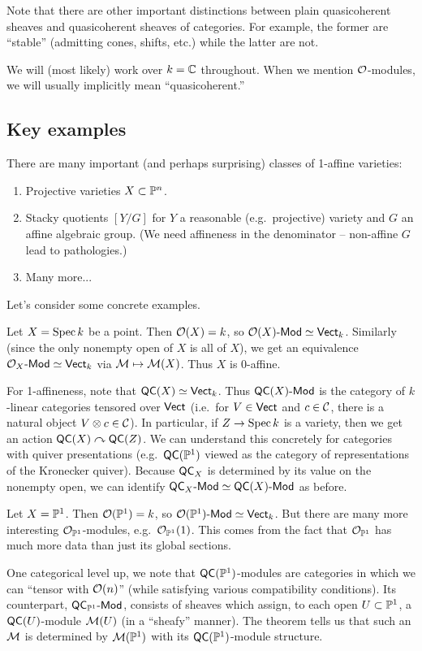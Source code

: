 \documentclass{article}
\begin{document}
Note that there are other important distinctions between plain quasicoherent sheaves and quasicoherent sheaves of categories.
For example, the former are ``stable'' (admitting cones, shifts, etc.) while the latter are not.

We will (most likely) work over $k = \mathbb{C}$ throughout.
When we mention $\mathcal{O}$-modules, we will usually implicitly mean ``quasicoherent.''

\subsection{Key examples}

There are many important (and perhaps surprising) classes of 1-affine varieties:

\begin{enumerate}
	\item Projective varieties $X \subset \mathbb{P}^n$.
	\item Stacky quotients $[Y / G]$ for $Y$ a reasonable (e.g.\ projective) variety and $G$ an affine algebraic group. (We need affineness in the denominator -- non-affine $G$ lead to pathologies.)
	\item Many more...
\end{enumerate}

Let's consider some concrete examples.

\begin{ex}
	Let $X = \operatorname{Spec} k$ be a point.
	Then $\mathcal{O}(X) = k$, so $\mathcal{O}(X)\text{-}\mathsf{Mod} \simeq \mathsf{Vect}_k$.
	Similarly (since the only nonempty open of $X$ is all of $X$), we get an equivalence $\mathcal{O}_X\text{-}\mathsf{Mod} \simeq \mathsf{Vect}_k$ via $\mathcal{M} \mapsto \mathcal{M}(X)$.
	Thus $X$ is 0-affine.

	For 1-affineness, note that $\mathsf{QC}(X) \simeq \mathsf{Vect}_k$.
	Thus $\mathsf{QC}(X)\text{-}\mathsf{Mod}$ is the category of $k$-linear categories tensored over $\mathsf{Vect}$ (i.e.\ for $V \in \mathsf{Vect}$ and $c \in \mathcal{C}$, there is a natural object $V \otimes c \in \mathcal{C}$).
	In particular, if $Z \to \operatorname{Spec} k$ is a variety, then we get an action $\mathsf{QC}(X) \curvearrowright \mathsf{QC}(Z)$.
	We can understand this concretely for categories with quiver presentations (e.g.\ $\mathsf{QC}(\mathbb{P}^1)$ viewed as the category of representations of the Kronecker quiver).
	Because $\mathsf{QC}_X$ is determined by its value on the nonempty open, we can identify $\mathsf{QC}_X\text{-}\mathsf{Mod} \simeq \mathsf{QC}(X)\text{-}\mathsf{Mod}$ as before.
\end{ex}

\begin{ex}
	Let $X = \mathbb{P}^1$.
	Then $\mathcal{O}(\mathbb{P}^1) = k$, so $\mathcal{O}(\mathbb{P}^1)\text{-}\mathsf{Mod} \simeq \mathsf{Vect}_k$.
	But there are many more interesting $\mathcal{O}_{\mathbb{P}^1}$-modules, e.g.\ $\mathcal{O}_{\mathbb{P}^1}(1)$.
	This comes from the fact that $\mathcal{O}_{\mathbb{P}^1}$ has much more data than just its global sections.

	One categorical level up, we note that $\mathsf{QC}(\mathbb{P}^1)$-modules are categories in which we can ``tensor with $\mathcal{O}(n)$'' (while satisfying various compatibility conditions).
	Its counterpart, $\mathsf{QC}_{\mathbb{P}^1}\text{-}\mathsf{Mod}$, consists of sheaves which assign, to each open $U \subset \mathbb{P}^1$, a $\mathsf{QC}(U)$-module $\mathcal{M}(U)$ (in a ``sheafy'' manner).
	The theorem tells us that such an $\mathcal{M}$ is determined by $\mathcal{M}(\mathbb{P}^1)$ with its $\mathsf{QC}(\mathbb{P}^1)$-module structure.
\end{ex}
\end{document}
